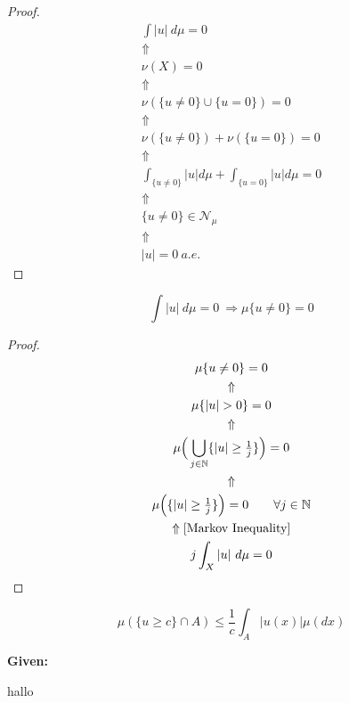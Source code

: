 \begin{proof}
\begin{gather*}
\int |u|\  d\mu =0 \\
\Uparrow  \\
\nu (X)=0 \\
\Uparrow  \\
\nu (\{u\neq 0\}\cup \{u=0\})=0\\
\Uparrow  \\
\nu (\{u\neq 0\})+\nu (\{u=0\})=0 \\
\Uparrow  \\
\int _{\{u\neq 0\}}|u| d\mu  +\int _{\{u=0\}}|u| d\mu  =0 \\
\Uparrow  \\
\{u\neq 0\}\in \mathcal{N}_\mu  \\
\Uparrow  \\
|u|=0 \  a.e.
\end{gather*}
\end{proof}

\begin{prop}
\[
\int |u|\  d\mu =0\  \Longrightarrow  \mu \{u\neq 0\}=0
\]
\end{prop}

\begin{proof}
\begin{gather*}
\mu \{u\neq 0\}=0 \\
\Uparrow  \\
\mu \{|u|>0\}=0 \\
\Uparrow  \\
\mu \Big(\bigcup _{j\in \Bbb{N}}\{|u|\geq \tfrac{1}{j}\}\Big)=0 \\
\Uparrow \\
\mu \Big(\{|u|\geq \tfrac{1}{j}\}\Big)=0 \qquad \forall  j\in \Bbb{N} \\
\Uparrow [\text{Markov Inequality}] \\
j \int _X |u|\  d\mu  =0
\end{gather*}
\end{proof}

\begin{prop}
\[
\mu (\{u\geq c\}\cap A)\leq \frac{1}{c} \int _A |u(x)|\mu (dx)
\]
\end{prop}

\begin{minipage}[t]{0.5\textwidth}
\textbf{Given:}
\end{minipage}
\begin{minipage}[t]{0.5\textwidth}
hallo
\end{minipage}
